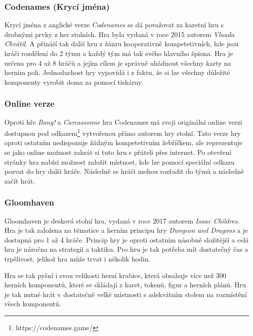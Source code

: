 \subsubsection{Codenames (Krycí jména)}
\label{subsubsec:popular-board-games-analysis-codenames}
Krycí jména z anglické verze \textit{Codenames} se dá považovat za karetní hru s drobnými prvky z her stolních. Hra byla vydaná v roce 2015 autorem \textit{Vlaada Chvátil}. A přináší tak další hru z žánru kooperativně kompetetivních, kde jsou hráči rozdělení do 2 týmu a každý tým má tak svého hlavního špiona. Hra je určena pro 4 až 8 hráčů a jejím cílem je správně uhádnout všechny karty na herním poli. Jednoduchost hry vypovídá i z faktu, že si lze všechny důležité komponenty vyrobit doma za pomocí tiskárny.

\subsubsection*{Online verze}
\label{subsubsec:popular-board-games-analysis-codenames-online}
Oproti hře \textit{Bang!} a \textit{Carcassonne} hra Codenames má svoji originální online verzi dostupnou pod odkazem\footnote{https://codenames.game/} vytvořenou přímo autorem hry stolní. Tato verze hry oproti ostatním nedisponuje žádným kompetetivním žebříčkem, ale reprezentuje se jako online možnost zahrát si tuto hru s přáteli přes internet. Po otevření stránky hra nabízí možnost založit místnost, kde lze pomocí speciální odkazu pozvat do hry další hráče. Následně se hráči mohou rozřadit do týmů a následně začít hrát.

\subsubsection{Gloomhaven}
\label{subsubsec:popular-board-games-analysis-gloomhaven}
Gloomhaven je desková stolní hra, vydaná v roce 2017 autorem \textit{Isaac Childres}. Hra je tak založena na tématice a herním principu hry \textit{Dungeon and Dragons} a je dostupná pro 1 až 4 hráče. Princip hry je oproti ostatním násobně složitější a celá hra je náročna na strategii a taktiku. Pro hru je tak potřeba mít dostatečný čas a trpělivost, jelikož hra může trvat i několik hodin.

Hra se tak pyšní i svou velikosti herní krabice, která obsahuje více než 300 herních komponentů, které se skládají z karet, tokenů, figur a herních plánů. Hru je tak nutné hrát v dostatečně velké místnosti s adekvátním stolem na rozmístění všech komponentů.

